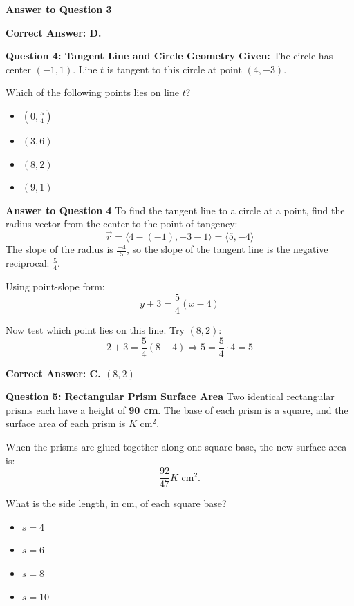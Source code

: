 \documentclass{beamer}
\begin{document}
\begin{frame}{\textbf{Answer to Question 3}}


\textbf{Correct Answer: D. }
\end{frame}

\begin{frame}{\textbf{Question 4: Tangent Line and Circle Geometry}}
\textbf{Given:} The circle has center \( (-1, 1) \). Line \( t \) is tangent to this circle at point \( (4, -3) \).

Which of the following points lies on line \( t \)?

\begin{itemize}
    \item[A.] \( (0, \frac{5}{4}) \)
    \item[B.] \( (3,6) \)
    \item[C.] \( (8,2) \)
    \item[D.] \( (9,1) \)
\end{itemize}
\end{frame}

\begin{frame}{\textbf{Answer to Question 4}}
To find the tangent line to a circle at a point, find the radius vector from the center to the point of tangency:
\[
\vec{r} = \langle 4 - (-1), -3 - 1 \rangle = \langle 5, -4 \rangle
\]
The slope of the radius is \( \frac{-4}{5} \), so the slope of the tangent line is the negative reciprocal: \( \frac{5}{4} \).

Using point-slope form:
\[
y + 3 = \frac{5}{4}(x - 4)
\]

Now test which point lies on this line. Try \( (8, 2) \):
\[
2 + 3 = \frac{5}{4}(8 - 4) \Rightarrow 5 = \frac{5}{4} \cdot 4 = 5
\]

\textbf{Correct Answer: C. \( (8,2) \)}
\end{frame}

\begin{frame}{\textbf{Question 5: Rectangular Prism Surface Area}}
Two identical rectangular prisms each have a height of \textbf{90 cm}. The base of each prism is a square, and the surface area of each prism is \( K \) cm\(^2\).

When the prisms are glued together along one square base, the new surface area is:
\[
\frac{92}{47} K \text{ cm}^2.
\]

What is the side length, in cm, of each square base?

\begin{itemize}
    \item[A.] \( s = 4 \)
    \item[B.] \( s = 6 \)
    \item[C.] \( s = 8 \)
    \item[D.] \( s = 10 \)
\end{itemize}
\end{frame}
\end{document}
